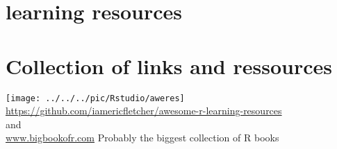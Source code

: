 \section{\R learning resources}

\section{Collection of links and ressources}
\begin{center}
	\texttt{[image: ../../../pic/Rstudio/aweres]}\\
\webbig\url{https://github.com/iamericfletcher/awesome-r-learning-resources}\\
and\\
\webbig\url{www.bigbookofr.com} Probably the biggest collection of R books
\end{center}



